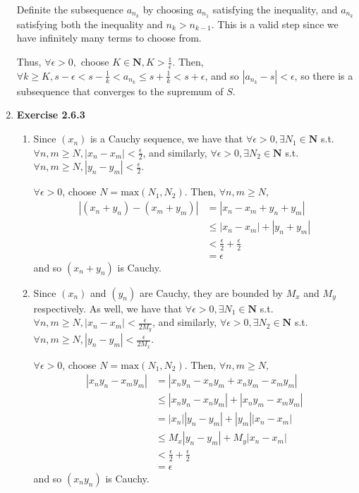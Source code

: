 \documentclass{article}
\begin{document}
\begin{enumerate}
        Definite the subsequence $a_{n_k}$ by choosing $a_{n_1}$ satisfying the inequality, and $a_{n_k}$ satisfying both the inequality and $n_k > n_{k-1}$. This is a valid step since we have infinitely many terms to choose from. 

        Thus, $\forall \epsilon > 0,$ choose $K \in \mathbf{N}, K > \frac{1}{\epsilon}$. Then, $\forall k \geq K, s - \epsilon < s - \frac{1}{k} < a_{n_k} \leq s + \frac{1}{k} < s + \epsilon$, and so $|a_{n_k} - s| < \epsilon$, so there is a subsequence that converges to the supremum of $S$.
    \item \textbf{Exercise 2.6.3}
        \begin{enumerate}
            \item Since $(x_n)$ is a Cauchy sequence, we have that $\forall \epsilon > 0, \exists N_1 \in \mathbf{N}$ s.t. $\forall n, m \geq N, |x_n - x_m| < \frac{\epsilon}{2}$, and similarly, $\forall \epsilon > 0, \exists N_2 \in \mathbf{N}$ s.t. $\forall n, m \geq N, |y_n - y_m| < \frac{\epsilon}{2}$.

            $\forall \epsilon > 0$, choose $N = \text{max}(N_1, N_2)$. Then, $\forall n, m \geq N,$ 
            \begin{align*}
                |(x_n + y_n) - (x_m + y_m)| &= |x_n - x_m + y_n + y_m| \\
                &\leq |x_n - x_m| + |y_n + y_m| \\
                &< \frac{\epsilon}{2} + \frac{\epsilon}{2} \\
                &= \epsilon
            \end{align*} 
            and so $(x_n + y_n)$ is Cauchy. 

            \item 
            Since $(x_n)$ and $(y_n)$ are Cauchy, they are bounded by $M_x$ and $M_y$ respectively. As well, we have that $\forall \epsilon > 0, \exists N_1 \in \mathbf{N}$ s.t. $\forall n, m \geq N, |x_n - x_m| < \frac{\epsilon}{2M_y}$, and similarly, $\forall \epsilon > 0, \exists N_2 \in \mathbf{N}$ s.t. $\forall n, m \geq N, |y_n - y_m| < \frac{\epsilon}{2M_x}$.

            $\forall \epsilon > 0$, choose $N = \text{max}(N_1, N_2)$. Then, $\forall n, m \geq N,$ 
            \begin{align*}
                |x_ny_n - x_my_m| &= |x_ny_n - x_ny_m + x_ny_m - x_my_m| \\
                &\leq |x_ny_n - x_ny_m| + |x_ny_m - x_my_m| \\
                &= |x_n||y_n - y_m| + |y_m||x_n - x_m| \\
                &\leq M_x|y_n - y_m| + M_y|x_n - x_m| \\
                &< \frac{\epsilon}{2} + \frac{\epsilon}{2} \\
                &= \epsilon
            \end{align*}
            and so $(x_ny_n)$ is Cauchy. 
        \end{enumerate}
\end{enumerate}
\end{document}
